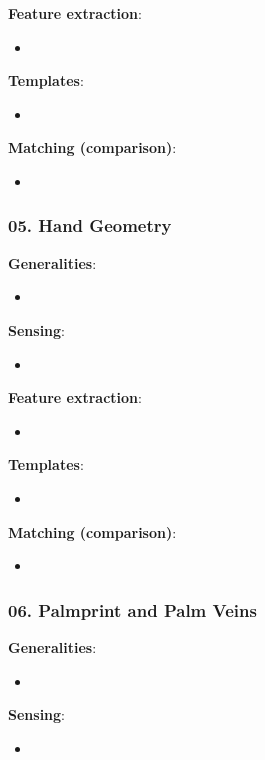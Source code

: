 \documentclass[a4paper]{article}
\begin{document}
      \textbf{Feature extraction}:
      \begin{itemize}
        \item 
      \end{itemize}

      \textbf{Templates}:
      \begin{itemize}
        \item 
      \end{itemize}

      \textbf{Matching (comparison)}:
      \begin{itemize}
        \item 
      \end{itemize}
    \newpage
    \subsubsection*{05. Hand Geometry}
      \textbf{Generalities}:
      \begin{itemize}
        \item 
      \end{itemize}

      \textbf{Sensing}:
      \begin{itemize}
        \item 
      \end{itemize}

      \textbf{Feature extraction}:
      \begin{itemize}
        \item 
      \end{itemize}

      \textbf{Templates}:
      \begin{itemize}
        \item 
      \end{itemize}

      \textbf{Matching (comparison)}:
      \begin{itemize}
        \item 
      \end{itemize}
    \newpage
    \subsubsection*{06. Palmprint and Palm Veins}
      \textbf{Generalities}:
      \begin{itemize}
        \item 
      \end{itemize}

      \textbf{Sensing}:
      \begin{itemize}
        \item 
      \end{itemize}
\end{document}
